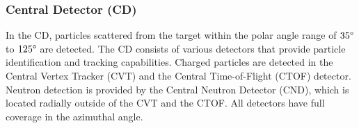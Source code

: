 \subsubsection{Central Detector (CD)}
\label{11.220::central_detector}
    In the CD, particles scattered from the target within the polar angle range of $35\degree$ to $125\degree$ are detected.
    The CD consists of various detectors that provide particle identification and tracking capabilities.
    Charged particles are detected in the Central Vertex Tracker (CVT) and the Central Time-of-Flight (CTOF) detector.
    Neutron detection is provided by the Central Neutron Detector (CND), which is located radially outside of the CVT and the CTOF.
    All detectors have full coverage in the azimuthal angle.

    
    
    
    

